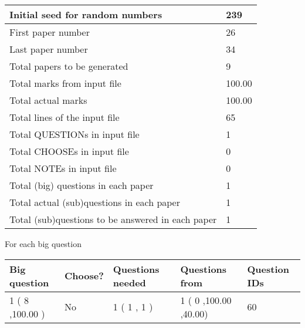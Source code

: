 \documentclass[12pt]{article}
\begin{document}
 \begin{tabular}{|l|l|}
 \hline
 Initial seed for random numbers &         239  \\
\hline
 First paper number &          26  \\
\hline
 Last  paper number &          34  \\
\hline
 Total papers to be generated &           9  \\
\hline
Total marks from input file & 100.00 \\
\hline
Total actual marks & 100.00 \\
\hline
 Total lines of the input file &          65  \\
 \hline
 Total QUESTIONs in input file &           1  \\
\hline
 Total CHOOSEs in input file &           0  \\
\hline
 Total NOTEs in input file &           0  \\
\hline
 Total (big) questions in each paper &           1  \\
\hline
 Total actual (sub)questions in each paper &           1  \\
\hline
 Total (sub)questions to be answered in each paper &           1  \\
\hline
 \end{tabular}
   
   
 \newpage
   
{\LARGE{For each big question}}
   
   
\vspace{0.2in}
   
   
\noindent\hspace{-0.4in}\begin{tabular}{|l|l|l|l|l|}
\hline
 Big question & Choose? & Questions needed & Questions from & Question IDs \\ 
\hline
           1 (           8 ,100.00
 ) &  No   & 
           1 (           1 ,            1 ) &            1 (           0
,100.00
 ,40.00) &           60  \\
 \hline
 \end{tabular}
 
 
\end{document}

